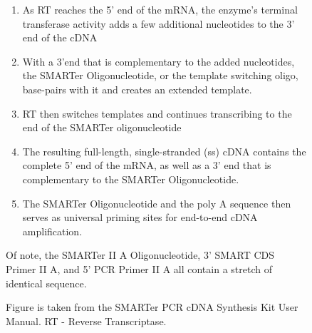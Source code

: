 \begin{figure}[htp]
{\begin{enumerate}
		\item As RT reaches the 5’ end of the mRNA, the enzyme’s terminal transferase activity adds a few additional nucleotides to the 3’ end of the cDNA
		\item With a 3’end that is complementary to the added nucleotides, the SMARTer Oligonucleotide, or the template switching oligo, base-pairs with it and creates an extended template.
		\item RT then switches templates and continues transcribing to the end of the SMARTer oligonucleotide 
		\item The resulting full-length, single-stranded (ss) cDNA contains the complete 5’ end of the mRNA, as well as a 3’ end that is complementary to the SMARTer Oligonucleotide. 
		\item The SMARTer Oligonucleotide and the poly A sequence then serves as universal priming sites for end-to-end cDNA amplification.
		\\
		
	\end{enumerate}
	Of note, the SMARTer II A Oligonucleotide, 3’ SMART CDS Primer II A, and 5’ PCR Primer II A all contain a stretch of identical sequence.  

	Figure is taken from the SMARTer PCR cDNA Synthesis Kit User Manual. RT - Reverse Transcriptase.
	}
	\label{fig:cDNAsynthesis_workflow}
\end{figure}



